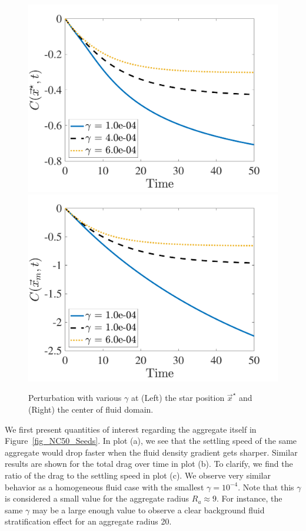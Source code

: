 \begin{figure}[h]
	\begin{center}
		\includegraphics[scale=0.35]{./figures/fig_NC50_g_C_star.pdf}
		\includegraphics[scale=0.35]{./figures/fig_NC50_g_C_M}
	\caption{Perturbation with various $\gamma$ at (Left) the star position $\vec{x}^{\star}$ and (Right) the center of fluid domain.}
	\label{fig_NC50_gCM}
\end{center}
\end{figure}
\par
We first present quantities of interest regarding the aggregate itself in Figure~\ref{fig_NC50_Seeds}. In plot (a), we see that the settling speed of the same aggregate would drop faster when the fluid density gradient gets sharper. Similar results are shown for the total drag over time in plot (b). To clarify, we find the ratio of the drag to the settling speed in plot (c). We observe very similar behavior as a homogeneous fluid case with the smallest $\gamma = 10^{-4}$. Note that this $\gamma$ is considered a small value for the aggregate radius $R_a \approx 9$. For instance, the same $\gamma$ may be a large enough value to observe a clear background fluid stratification effect for an aggregate radius 20.
